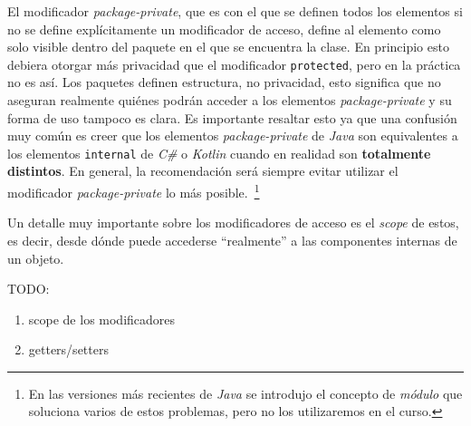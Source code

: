   El modificador \textit{package-private}, que es con el que se definen todos los elementos si no se
  define explícitamente un modificador de acceso, define al elemento como solo visible dentro del 
  paquete en el que se encuentra la clase.
  En principio esto debiera otorgar más privacidad que el modificador \texttt{protected},
  pero en la práctica no es así.
  Los paquetes definen estructura, no privacidad, esto significa que no aseguran realmente quiénes
  podrán acceder a los elementos \textit{package-private} y su forma de uso tampoco es clara.
  Es importante resaltar esto ya que una confusión muy común es creer que los elementos 
  \textit{package-private} de \textit{Java} son equivalentes a los elementos 
  \texttt{internal} de \textit{C\#} o \textit{Kotlin} cuando en realidad son 
  \textbf{totalmente distintos}.
  En general, la recomendación será siempre evitar utilizar el modificador \textit{package-private}
  lo más posible.\autocite{ham-package-private}\ \footnote{En las versiones más recientes de 
  \textit{Java} se introdujo el concepto de \textit{módulo} que soluciona varios de estos problemas,
  pero no los utilizaremos en el curso.}

  Un detalle muy importante sobre los modificadores de acceso es el \textit{scope} de estos, es 
  decir, desde dónde puede accederse \enquote{realmente} a las componentes internas de un objeto.
  
  TODO:
  \begin{enumerate}
    \item scope de los modificadores
    \item getters/setters
  \end{enumerate}
%